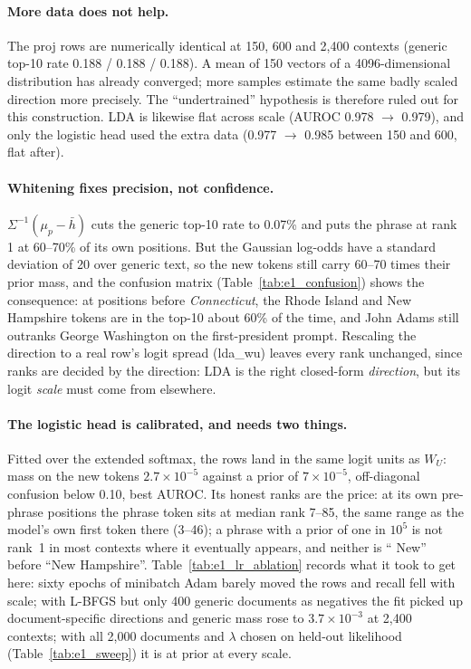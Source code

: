 \documentclass[11pt]{article}
\newcommand{\WU}{W_U}
\renewcommand{\hbar}{\bar{h}}
\newcommand{\lens}[1]{\textsf{#1}}
\begin{document}
\paragraph{More data does not help.}
The \lens{proj} rows are numerically identical at 150, 600 and 2{,}400 contexts (generic top-10 rate 0.188 / 0.188 / 0.188). A mean of 150 vectors of a 4096-dimensional distribution has already converged; more samples estimate the same badly scaled direction more precisely. The ``undertrained'' hypothesis is therefore ruled out for this construction. LDA is likewise flat across scale (AUROC 0.978 $\to$ 0.979), and only the logistic head used the extra data (0.977 $\to$ 0.985 between 150 and 600, flat after).

\paragraph{Whitening fixes precision, not confidence.}
$\Sigma^{-1}(\mu_p-\hbar)$ cuts the generic top-10 rate to 0.07\% and puts the phrase at rank 1 at 60--70\% of its own positions. But the Gaussian log-odds have a standard deviation of 20 over generic text, so the new tokens still carry 60--70 times their prior mass, and the confusion matrix (Table~\ref{tab:e1_confusion}) shows the consequence: at positions before \emph{Connecticut}, the Rhode Island and New Hampshire tokens are in the top-10 about 60\% of the time, and John Adams still outranks George Washington on the first-president prompt. Rescaling the direction to a real row's logit spread (\lens{lda\_wu}) leaves every rank unchanged, since ranks are decided by the direction: LDA is the right closed-form \emph{direction}, but its logit \emph{scale} must come from elsewhere.



\paragraph{The logistic head is calibrated, and needs two things.}
Fitted over the extended softmax, the rows land in the same logit units as $\WU$: mass on the new tokens $2.7\times10^{-5}$ against a prior of $7\times10^{-5}$, off-diagonal confusion below 0.10, best AUROC. Its honest ranks are the price: at its own pre-phrase positions the phrase token sits at median rank 7--85, the same range as the model's own first token there (3--46); a phrase with a prior of one in $10^5$ is not rank~1 in most contexts where it eventually appears, and neither is `` New'' before ``New Hampshire''. Table~\ref{tab:e1_lr_ablation} records what it took to get here: sixty epochs of minibatch Adam barely moved the rows and recall fell with scale; with L-BFGS but only 400 generic documents as negatives the fit picked up document-specific directions and generic mass rose to $3.7\times10^{-3}$ at 2{,}400 contexts; with all 2{,}000 documents and $\lambda$ chosen on held-out likelihood (Table~\ref{tab:e1_sweep}) it is at prior at every scale.
\end{document}
